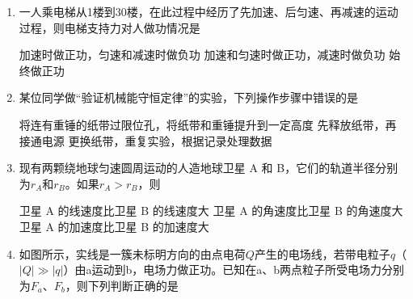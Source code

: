 \documentclass[\gkver]{gaokaozhenti}
\begin{document}
\begin{enumerate}
{2倍}
{3倍}
{4倍}


\item
一人乘电梯从1楼到30楼，在此过程中经历了先加速、后匀速、再减速的运动过程，则电梯支持力对人做功情况是

{加速时做正功，匀速和减速时做负功}
{加速和匀速时做正功，减速时做负功}
{始终做正功}


\item
某位同学做“验证机械能守恒定律”的实验，下列操作步骤中错误的是

{将连有重锤的纸带过限位孔，将纸带和重锤提升到一定高度}
{先释放纸带，再接通电源}
{更换纸带，重复实验，根据记录处理数据}


\item
现有两颗绕地球匀速圆周运动的人造地球卫星 A 和 B，它们的轨道半径分别为$r_{A}$和$r_{B}$。如果$r_{A}>r_{B}$，则

{卫星 A 的线速度比卫星 B 的线速度大}
{卫星 A 的角速度比卫星 B 的角速度大}
{卫星 A 的加速度比卫星 B 的加速度大}


\item
如图所示，实线是一簇未标明方向的由点电荷$Q$产生的电场线，若带电粒子$q$（$|Q|\gg|q|$）由a运动到b，电场力做正功。已知在a、b两点粒子所受电场力分别为$F_{a}$、$F_{b}$，则下列判断正确的是


\end{enumerate}
\end{document}
